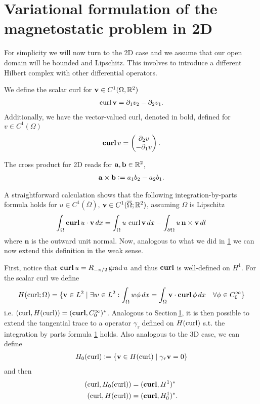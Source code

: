 \documentclass[../master_thesis.tex]{subfiles}
\begin{document}
\section{Variational formulation of the magnetostatic problem in 2D}

For simplicity we will now turn to the 2D case and we assume that 
our open domain will be bounded and Lipschitz. This involves to introduce 
a different Hilbert complex with other differential operators. 

We define the scalar curl for $\mathbf{v} \in C^1(\Omega,\real^2)$
\begin{align*}
    \curl \mathbf{v} = \partial_1 v_2 - \partial_2 v_1.
\end{align*}
Additionally, we have the vector-valued curl, denoted in bold, defined 
for $v \in C^1(\Omega)$
\begin{align*}
    \veccurl v = \begin{pmatrix}\partial_2 v \\ -\partial_1 v    \end{pmatrix}.
\end{align*}

The cross product for 2D reads for $\mathbf{a}, \mathbf{b} \in \real^2$,
\begin{align*}
    \mathbf{a} \times \mathbf{b} \vcentcolon= a_1 b_2- a_2 b_1.
\end{align*}

A straightforward calculation shows that the following integration-by-parts formula 
holds for $u \in C^1(\overline{\Omega})$, $\mathbf{v} \in C^1(\overline{\Omega};\real^2)$,
assuming $\Omega$ is Lipschitz
\begin{align*}
    \int_\Omega \veccurl u \cdot \mathbf{v} \,dx 
    = \int_\Omega u \, \curl \mathbf{v} \, dx - \int_{\partial \Omega} u\, \mathbf{n}\times \mathbf{v} \, dl
\end{align*}
where $\mathbf{n}$ is the outward unit normal.
Now, analogous to what we did in \ref{} we can now extend this definition in the weak sense.

First, notice that $\veccurl u = R_{-\pi/2} \grad u$ and thus $\veccurl$ is well-defined 
on $H^1$. For the scalar curl we define 
\begin{align*}
    H(\curl;\Omega) = \{ \mathbf{v} \in L^2 \mid \exists  w \in L^2: 
        \int_\Omega w \phi \, dx = \int_\Omega \mathbf{v} \cdot \veccurl \phi \, dx 
        \quad \forall \phi \in C_0^\infty \}
\end{align*}
i.e. $(\curl, H(\curl)) = (\veccurl, C_0^\infty)^*$. 
Analogous to Section\,\ref{}, it is then possible to extend the 
tangential trace to a operator $\gamma_\tau$ defined on $H(\curl)$ s.t. 
the integration by parts formula \ref{} holds. Also analogous to the 3D case,
we can define 
\begin{align*}
    H_0(\curl) \vcentcolon= \{ \mathbf{v} \in H(\curl) \mid \gamma_\tau \mathbf{v} = 0\}
\end{align*}
and then
\begin{align*}
    (\curl, H_0(\curl)) & = (\veccurl, H^1)^* 
    \\ (\curl, H(\curl)) & = (\veccurl, H_0^1)^*.
\end{align*}
\end{document}
